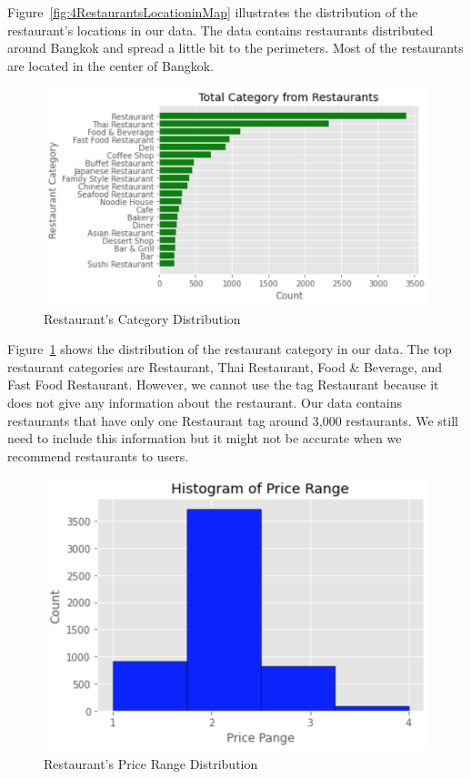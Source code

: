 \documentclass[12pt,oneside,openright,a4paper]{cpe-english-project}
\begin{document}
Figure~\ref{fig:4RestaurantsLocationinMap} illustrates the distribution of the restaurant’s locations in our data. The data contains restaurants distributed around Bangkok and spread a little bit to the perimeters. Most of the restaurants are located in the center of Bangkok.

\begin{figure}[H]\centering
\includegraphics[width=350pt]{./images/4RestaurantsCategoryDistribution.png}
\caption{Restaurant’s Category Distribution}\label{fig:4RestaurantsCategoryDistribution}
\end{figure}

Figure~\ref{fig:4RestaurantsCategoryDistribution} shows the distribution of the restaurant category in our data. The top restaurant categories are Restaurant, Thai Restaurant, Food \& Beverage, and Fast Food Restaurant. However, we cannot use the tag Restaurant because it does not give any information about the restaurant. Our data contains restaurants that have only one Restaurant tag around 3,000 restaurants. We still need to include this information but it might not be accurate when we recommend restaurants to users.

\begin{figure}[H]\centering
\includegraphics[width=350pt]{./images/4RestaurantsPriceRangeDistribution.png}
\caption{Restaurant’s Price Range Distribution}\label{fig:4RestaurantsPriceRangeDistribution}
\end{figure}
\end{document}
